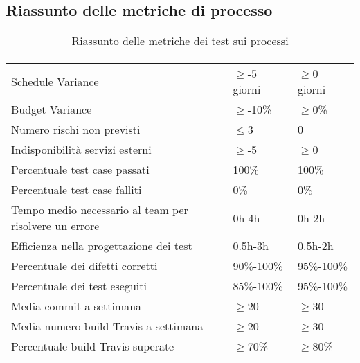 \subsection{Riassunto delle metriche di processo}
\renewcommand{\arraystretch}{1.5}
\begin{table}[H]
	\centering
	\begin{tabular}{|C{5cm}|C{4cm}|C{4cm}|}
		\hline
		\textbf{\color{title_text}{Nome Metrica}} &  \textbf{\color{title_text}{Range accettabile}} & \textbf{\color{title_text}{Range ottimale}} \\ \hline
		Schedule Variance & $\geq$-5 giorni  & $\geq$0 giorni \\ \hline
		Budget Variance&$\geq$-10\% &$\geq$0\% \\ \hline
		Numero rischi non previsti&$\leq$3 & 0 \\ \hline
		Indisponibilità servizi esterni&$\geq$-5 &$\geq$0 \\ \hline
		Percentuale test case passati & 100\%  & 100\% \\ \hline
		Percentuale test case falliti & 0\% & 0\% \\ \hline
		Tempo medio necessario al team per risolvere un errore & 0h-4h & 0h-2h \\ \hline
		Efficienza nella progettazione dei test & 0.5h-3h & 0.5h-2h \\ \hline
		Percentuale dei difetti corretti & 90\%-100\% & 95\%-100\% \\ \hline
		Percentuale dei test eseguiti & 85\%-100\% & 95\%-100\% \\ \hline
		Media commit a settimana&$\geq$20 &$\geq$30 \\ \hline
		Media numero build Travis a settimana&$\geq$20 &$\geq$30 \\ \hline
		Percentuale build Travis superate& $\geq$70\% &$\geq$80\% \\ \hline
	\end{tabular}
	\caption{Riassunto delle metriche dei test sui processi}
	\label{tabella:riassunto metriche dei test sui processi}
\end{table}
\renewcommand{\arraystretch}{1}

\pagebreak
